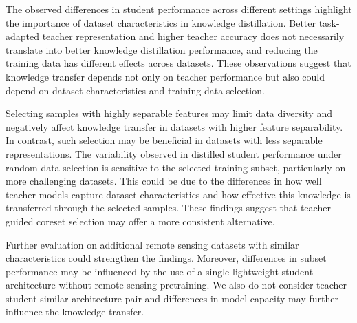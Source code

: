 \documentclass[conference]{IEEEtran}
\begin{document}
The observed differences in student performance across different settings highlight the importance of dataset characteristics in knowledge distillation.
Better task-adapted teacher representation and higher teacher accuracy does not necessarily translate into better knowledge distillation performance, and reducing the training data has different effects across datasets.
These observations suggest that knowledge transfer depends not only on teacher performance but also could depend on dataset characteristics and training data selection.

Selecting samples with highly separable features may limit data diversity and negatively affect knowledge transfer in datasets with higher feature separability.
In contrast, such selection may be beneficial in datasets with less separable representations.
The variability observed in distilled student performance under random data selection is sensitive to the selected training subset, particularly on more challenging datasets.
This could be due to the differences in how well teacher models capture dataset characteristics and how effective this knowledge is transferred through the selected samples.
These findings suggest that teacher-guided coreset selection may offer a more consistent alternative.

Further evaluation on additional remote sensing datasets with similar characteristics could strengthen the findings.
Moreover, differences in subset performance may be influenced by the use of a single lightweight student architecture without remote sensing pretraining.
We also do not consider teacher--student similar architecture pair and differences in model capacity may further influence the knowledge transfer.

\end{document}
